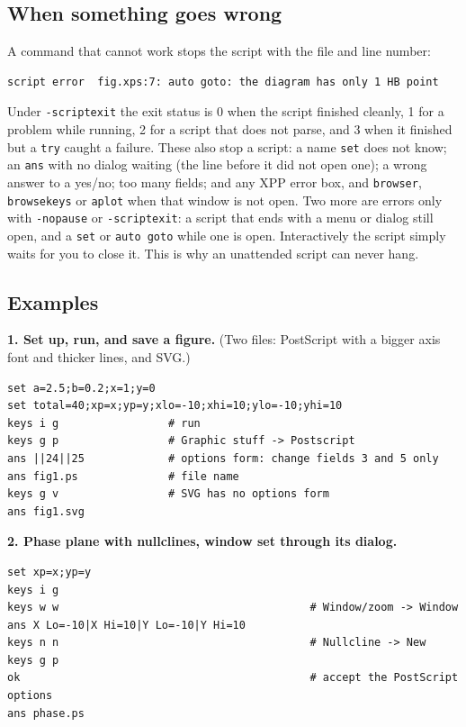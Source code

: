 \documentclass{article}
\begin{document}
\subsection{When something goes wrong}\label{scr:12}

A command that cannot work stops the script with the file and line
number:

{\small\begin{verbatim}
script error  fig.xps:7: auto goto: the diagram has only 1 HB point
\end{verbatim}}

Under \texttt{-scriptexit} the exit status is 0 when the script
finished cleanly, 1 for a problem while running, 2 for a script that
does not parse, and 3 when it finished but a \texttt{try} caught a
failure. These also stop a script: a name \texttt{set} does not
know; an \texttt{ans} with no dialog waiting (the line before it did
not open one); a wrong answer to a yes/no; too many fields; and any XPP
error box, and \texttt{browser}, \texttt{browsekeys} or
\texttt{aplot} when that window is not open. Two more are errors only with \texttt{-nopause} or
\texttt{-scriptexit}: a script that ends with a menu or dialog still
open, and a \texttt{set} or \texttt{auto\ goto} while one is
open. Interactively the script simply waits for you to close it. This is
why an unattended script can never hang.

\subsection{Examples}\label{scr:13}

\textbf{1. Set up, run, and save a figure.} (Two files:
PostScript with a bigger axis font and thicker lines, and SVG.)

{\small\begin{verbatim}
set a=2.5;b=0.2;x=1;y=0
set total=40;xp=x;yp=y;xlo=-10;xhi=10;ylo=-10;yhi=10
keys i g                 # run
keys g p                 # Graphic stuff -> Postscript
ans ||24||25             # options form: change fields 3 and 5 only
ans fig1.ps              # file name
keys g v                 # SVG has no options form
ans fig1.svg
\end{verbatim}}

\textbf{2. Phase plane with nullclines, window set through its
dialog.}

{\small\begin{verbatim}
set xp=x;yp=y
keys i g
keys w w                                       # Window/zoom -> Window
ans X Lo=-10|X Hi=10|Y Lo=-10|Y Hi=10
keys n n                                       # Nullcline -> New
keys g p
ok                                             # accept the PostScript options
ans phase.ps
\end{verbatim}}
\end{document}
